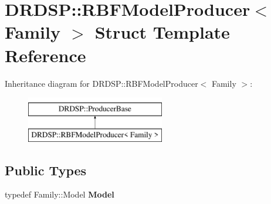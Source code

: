 \hypertarget{struct_d_r_d_s_p_1_1_r_b_f_model_producer}{\section{D\-R\-D\-S\-P\-:\-:R\-B\-F\-Model\-Producer$<$ Family $>$ Struct Template Reference}
\label{struct_d_r_d_s_p_1_1_r_b_f_model_producer}
}
Inheritance diagram for D\-R\-D\-S\-P\-:\-:R\-B\-F\-Model\-Producer$<$ Family $>$\-:\begin{figure}[H]
\begin{center}
\leavevmode
\includegraphics[height=2.000000cm]{struct_d_r_d_s_p_1_1_r_b_f_model_producer}
\end{center}
\end{figure}
\subsection*{Public Types}
\begin{DoxyCompactItemize}
\item 
\hypertarget{struct_d_r_d_s_p_1_1_r_b_f_model_producer_a560d2264a7b87e66d89e34bf0514c9c3}{typedef Family\-::\-Model {\bfseries Model}}\label{struct_d_r_d_s_p_1_1_r_b_f_model_producer_a560d2264a7b87e66d89e34bf0514c9c3}

\end{DoxyCompactItemize}

